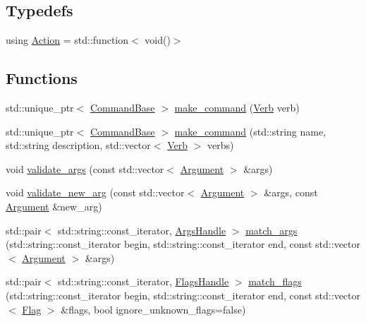 \subsection*{Typedefs}
\begin{DoxyCompactItemize}
\item 
using \mbox{\hyperlink{namespacexd_1_1repl_1_1cmd_a7274841bd02a9c5da0ba48ae204ab3d5}{Action}} = std\+::function$<$ void()$>$
\end{DoxyCompactItemize}
\subsection*{Functions}
\begin{DoxyCompactItemize}
\item 
std\+::unique\+\_\+ptr$<$ \mbox{\hyperlink{classxd_1_1repl_1_1cmd_1_1_command_base}{Command\+Base}} $>$ \mbox{\hyperlink{namespacexd_1_1repl_1_1cmd_a5b8451665b6551b691cea4e66fb5eb84}{make\+\_\+command}} (\mbox{\hyperlink{classxd_1_1repl_1_1cmd_1_1_verb}{Verb}} verb)
\item 
std\+::unique\+\_\+ptr$<$ \mbox{\hyperlink{classxd_1_1repl_1_1cmd_1_1_command_base}{Command\+Base}} $>$ \mbox{\hyperlink{namespacexd_1_1repl_1_1cmd_adfa9dfe4494b4e94f13d93c728ed58b6}{make\+\_\+command}} (std\+::string name, std\+::string description, std\+::vector$<$ \mbox{\hyperlink{classxd_1_1repl_1_1cmd_1_1_verb}{Verb}} $>$ verbs)
\item 
void \mbox{\hyperlink{namespacexd_1_1repl_1_1cmd_aa5d4e3633aec5329d5533af2c8bce490}{validate\+\_\+args}} (const std\+::vector$<$ \mbox{\hyperlink{classxd_1_1repl_1_1cmd_1_1_argument}{Argument}} $>$ \&args)
\item 
void \mbox{\hyperlink{namespacexd_1_1repl_1_1cmd_a9d85acd34090e890b4f95a3177adb8c6}{validate\+\_\+new\+\_\+arg}} (const std\+::vector$<$ \mbox{\hyperlink{classxd_1_1repl_1_1cmd_1_1_argument}{Argument}} $>$ \&args, const \mbox{\hyperlink{classxd_1_1repl_1_1cmd_1_1_argument}{Argument}} \&new\+\_\+arg)
\item 
std\+::pair$<$ std\+::string\+::const\+\_\+iterator, \mbox{\hyperlink{classxd_1_1repl_1_1cmd_1_1_args_handle}{Args\+Handle}} $>$ \mbox{\hyperlink{namespacexd_1_1repl_1_1cmd_ae81695e15af5bcbabe68acd7894dc4a4}{match\+\_\+args}} (std\+::string\+::const\+\_\+iterator begin, std\+::string\+::const\+\_\+iterator end, const std\+::vector$<$ \mbox{\hyperlink{classxd_1_1repl_1_1cmd_1_1_argument}{Argument}} $>$ \&args)
\item 
std\+::pair$<$ std\+::string\+::const\+\_\+iterator, \mbox{\hyperlink{classxd_1_1repl_1_1cmd_1_1_flags_handle}{Flags\+Handle}} $>$ \mbox{\hyperlink{namespacexd_1_1repl_1_1cmd_adc340024a2d8596b7e9c0a7bb2bbdc35}{match\+\_\+flags}} (std\+::string\+::const\+\_\+iterator begin, std\+::string\+::const\+\_\+iterator end, const std\+::vector$<$ \mbox{\hyperlink{classxd_1_1repl_1_1cmd_1_1_flag}{Flag}} $>$ \&flags, bool ignore\+\_\+unknown\+\_\+flags=false)

\end{DoxyCompactItemize}
